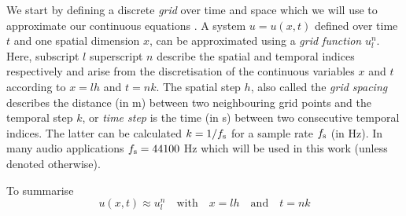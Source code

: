 We start by defining a discrete \textit{grid} over time and space which we will use to approximate our continuous equations . A system $u = u(x,t)$ defined over time $t$ and one spatial dimension $x$, can be approximated using a \textit{grid function} $u_l^n$. Here, subscript $l$ superscript $n$ describe the spatial and temporal indices respectively and arise from the discretisation of the continuous variables $x$ and $t$ according to $x=lh$ and $t=nk$. The spatial step $h$, also called the \textit{grid spacing} describes the distance (in m) between two neighbouring grid points and the temporal step $k$, or \textit{time step} is the time (in s) between two consecutive temporal indices. The latter can be calculated $k=1/f_\text{s}$ for a sample rate $f_\text{s}$ (in Hz). In many audio applications $f_\text{s} = 44100$ Hz which will be used in this work (unless denoted otherwise).

To summarise
\begin{equation}
    u(x,t) \approx u_l^n \quad \text{with} \quad x=lh \quad \text{and} \quad t = nk
\end{equation}

